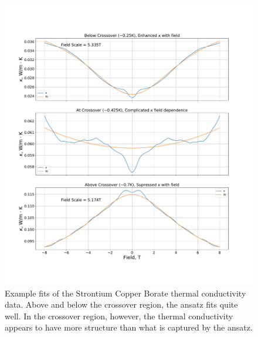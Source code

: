 \documentclass{thesis-umich}
\begin{document}
\begin{figure}
	\caption[Example Fits of SCBO Data.]{Example fits of the Strontium Copper Borate thermal conductivity data. Above and below the crossover region, the ansatz fits quite well. In the crossover region, however, the thermal conductivity appears to have more structure than what is captured by the ansatz.}
	\label{fig:SCBO_example_fits}
	\includegraphics[width=\columnwidth]{figures/SCBO_kappa_vs_b_fits.pdf}
\end{figure}
\end{document}

